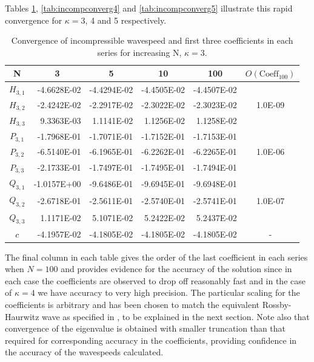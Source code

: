 Tables \ref{tab:incompconverg3}, \ref{tab:incompconverg4} and \ref{tab:incompconverg5} illustrate this rapid convergence for $\kappa=3$, 4 and 5 respectively.
\begin{table}[htbp]
	\centering
		\begin{tabular}{|c|r|r|r|r|c|} \hline
		N&\multicolumn{1}{|c|}{3}&\multicolumn{1}{|c|}{5}&\multicolumn{1}{|c|}{10}&
		\multicolumn{1}{|c|}{100}&$O(\text{Coeff}_{100})$ \\
		\hline
		$H_{3,1}$ &-4.6628E-02& -4.4294E-02&-4.4505E-02& -4.4507E-02&\\
		$H_{3,2}$ &-2.4242E-02&-2.2917E-02&-2.3022E-02&-2.3023E-02&1.0E-09 \\
		$H_{3,3}$ &9.3363E-03&1.1141E-02&1.1256E-02&1.1258E-02& \\ \hline
		$P_{3,1}$ &-1.7968E-01&-1.7071E-01&-1.7152E-01&-1.7153E-01& \\
		$P_{3,2}$ &-6.5140E-01&-6.1965E-01&-6.2262E-01&-6.2265E-01&1.0E-06\\
		$P_{3,3}$ &-2.1733E-01&-1.7497E-01&-1.7495E-01&-1.7494E-01& \\ \hline
		$Q_{3,1}$ &-1.0157E+00&-9.6486E-01&-9.6945E-01&-9.6948E-01& \\
		$Q_{3,2}$ &-2.6718E-01&-2.5611E-01&-2.5740E-01&-2.5741E-01&1.0E-07\\
		$Q_{3,3}$ &1.1171E-02&5.1071E-02&5.2422E-02&5.2437E-02& \\ \hline
		$c$ &-4.1957E-02&-4.1805E-02&-4.1805E-02&-4.1805E-02&- \\
		\hline			
		\end{tabular}
	\caption{Convergence of incompressible wavespeed and first three coefficients in each series for increasing N, $\kappa=3$.}
	\label{tab:incompconverg3}
\end{table}
The final column in each table gives the order of the last coefficient in each series when $N=100$ and provides evidence for the accuracy of the solution since in each case the coefficients are observed to drop off reasonably fast and in the case of $\kappa=4$ we have accuracy to very high precision. The particular scaling for the coefficients is arbitrary and has been chosen to match the equivalent Rossby-Haurwitz wave as specified in \cite{Williamson:STS}, to be explained in the next section. Note also that convergence of the eigenvalue is obtained with smaller truncation than that required for corresponding accuracy in the coefficients, providing confidence in the accuracy of the wavespeeds calculated. 
